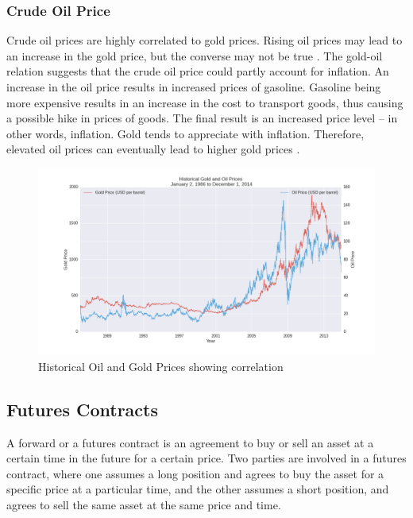 \documentclass[runningheads]{llncs}
\begin{document}
\subsubsection{Crude Oil Price}
Crude oil prices are highly correlated to gold prices. Rising oil prices may lead to an increase in the gold price, but the converse may not be true \cite{gold-shafiee}\cite{gold-zhang}.
The gold-oil relation suggests that the crude oil price could partly account for inflation. An increase in the oil price results in increased prices of gasoline. Gasoline being more expensive results in an increase in the cost to transport goods, thus causing a possible hike in prices of goods. The final result is an increased price level – in other words, inflation. Gold tends to appreciate with inflation. Therefore, elevated oil prices can eventually lead to higher gold prices \cite{gold-url1}. 

\begin{figure}
\centering
\includegraphics[width=\textwidth]{OilvsGold.png}
\caption{Historical Oil and Gold Prices showing correlation}
\label{fig:OilvsGold.png}
\end{figure}

\newpage

\subsection {Futures Contracts}

\noindent A forward or a futures contract is an agreement to buy or sell an asset at a certain time in the future for a certain price. Two parties are involved in a futures contract, where one assumes a long position and agrees to buy the asset for a specific price at a particular time, and the other assumes a short position, and agrees to sell the same asset at the same price and time. \\
\end{document}
